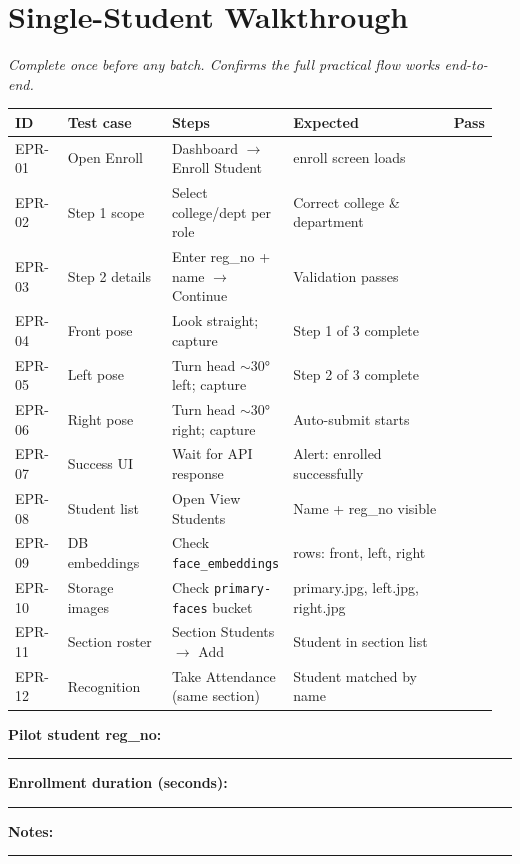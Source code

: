 \documentclass[11pt,a4paper,oneside]{article}
\newcommand{\chk}{\fbox{\rule{0pt}{0.95ex}\rule{0.95ex}{0pt}}}
\newcommand{\fillin}[1][3cm]{\rule{#1}{0.4pt}}
\newcommand{\fillinlong}{\rule{0.72\textwidth}{0.4pt}}
\newcommand{\notesblock}{\par\smallskip\noindent\textbf{Notes:}\ \fillinlong\par\smallskip}
\newcommand{\fieldline}[1]{\par\smallskip\noindent\textbf{#1}\ \fillin\par}
\newcommand{\tcheadfive}{%
  \toprule
  \textbf{ID} & \textbf{Test case} & \textbf{Steps} & \textbf{Expected} & \textbf{Pass} \\
  \midrule
}
\begin{document}
\section{Single-Student Walkthrough}

\noindent\textit{Complete once before any batch. Confirms the full practical flow works end-to-end.}

\smallskip
\small
\begin{tabular}{@{}>{\raggedright\arraybackslash}p{0.11\linewidth} >{\raggedright\arraybackslash}p{0.22\linewidth} >{\raggedright\arraybackslash}p{0.22\linewidth} >{\raggedright\arraybackslash}p{0.35\linewidth} >{\centering\arraybackslash}p{0.06\linewidth}@{}}
  \tcheadfive
  EPR-01 & Open Enroll & Dashboard $\rightarrow$ Enroll Student & enroll screen loads & \chk \\
  EPR-02 & Step 1 scope & Select college/dept per role & Correct college \& department & \chk \\
  EPR-03 & Step 2 details & Enter reg\_no + name $\rightarrow$ Continue & Validation passes & \chk \\
  EPR-04 & Front pose & Look straight; capture & Step 1 of 3 complete & \chk \\
  EPR-05 & Left pose & Turn head $\sim$30° left; capture & Step 2 of 3 complete & \chk \\
  EPR-06 & Right pose & Turn head $\sim$30° right; capture & Auto-submit starts & \chk \\
  EPR-07 & Success UI & Wait for API response & Alert: enrolled successfully & \chk \\
  EPR-08 & Student list & Open View Students & Name + reg\_no visible & \chk \\
  EPR-09 & DB embeddings & Check \texttt{face\_embeddings} & 3 rows: front, left, right & \chk \\
  EPR-10 & Storage images & Check \texttt{primary-faces} bucket & primary.jpg, left.jpg, right.jpg & \chk \\
  EPR-11 & Section roster & Section Students $\rightarrow$ Add & Student in section list & \chk \\
  EPR-12 & Recognition & Take Attendance (same section) & Student matched by name & \chk \\
  \bottomrule
\end{tabular}
\normalsize

\fieldline{Pilot student reg\_no:}
\fieldline{Enrollment duration (seconds):}
\notesblock
\end{document}

